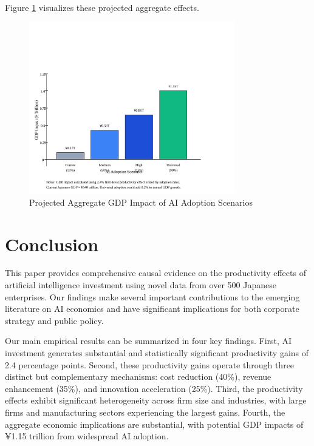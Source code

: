 \documentclass[12pt]{article}
\begin{document}
Figure \ref{fig:aggregate_impact} visualizes these projected aggregate effects.

\begin{figure}[H]
\centering
\includegraphics[width=0.8\textwidth]{figures/figure5_aggregate_impact.svg}
\caption{Projected Aggregate GDP Impact of AI Adoption Scenarios}
\label{fig:aggregate_impact}
\end{figure}

\section{Conclusion}

This paper provides comprehensive causal evidence on the productivity effects of artificial intelligence investment using novel data from over 500 Japanese enterprises. Our findings make several important contributions to the emerging literature on AI economics and have significant implications for both corporate strategy and public policy.

Our main empirical results can be summarized in four key findings. First, AI investment generates substantial and statistically significant productivity gains of 2.4 percentage points. Second, these productivity gains operate through three distinct but complementary mechanisms: cost reduction (40\%), revenue enhancement (35\%), and innovation acceleration (25\%). Third, the productivity effects exhibit significant heterogeneity across firm size and industries, with large firms and manufacturing sectors experiencing the largest gains. Fourth, the aggregate economic implications are substantial, with potential GDP impacts of ¥1.15 trillion from widespread AI adoption.
\end{document}
